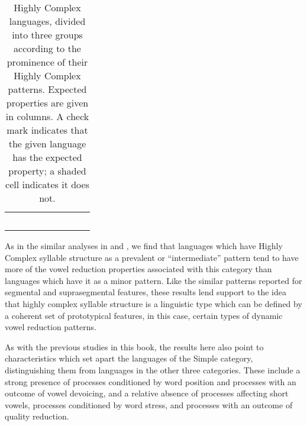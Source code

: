 \begin{table}
\begin{tabularx}{\textwidth}{lCCCCCCCC}
  &  &  &  &  &  &  &  &  \\
  & { } &  &  &  &  &  &  &  \\
  &  &  &  &  &  &  &  &  \\
  &  &  &  &  &  &  &  &  \\
\lspbottomrule
\end{tabularx}
\caption{\label{tab:6.11}Highly Complex languages, divided into three groups according to the prominence of their Highly Complex patterns. Expected properties are given in columns. A check mark indicates that the given language has the expected property; a shaded cell indicates it does not.}
\end{table}

As in the similar analyses in  and , we find that languages which have Highly Complex syllable structure as a prevalent or ``intermediate'' pattern tend to have more of the vowel reduction properties associated with this category than languages which have it as a minor pattern. Like the similar patterns reported for segmental and suprasegmental features, these results lend support to the idea that highly complex syllable structure is a linguistic type which can be defined by a coherent set of prototypical features, in this case, certain types of dynamic vowel reduction patterns.

  As with the previous studies in this book, the results here also point to characteristics which set apart the languages of the Simple category, distinguishing them from languages in the other three categories. These include a strong presence of processes conditioned by word position and processes with an outcome of vowel devoicing, and a relative absence of processes affecting short vowels, processes conditioned by word stress, and processes with an outcome of quality reduction.

